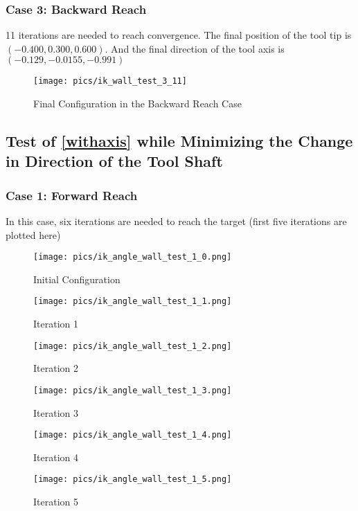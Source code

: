 \documentclass[english,10pt,a4paper]{book}
\begin{document}
		\subsubsection{Case 3: Backward Reach}
		11 iterations are needed to reach convergence.
		The final position of the tool tip is \((-0.400, 0.300, 0.600)\). And the final direction of the tool axis is \((-0.129, -0.0155, -0.991)\)
		\begin{figure}[H]
			\texttt{[image: pics/ik\_wall\_test\_3\_11]}
			\caption{Final Configuration in the Backward Reach Case}
		\end{figure}
		
		\subsection{Test of \ref{withaxis} while Minimizing the Change in Direction of the Tool Shaft}
		\subsubsection{Case 1: Forward Reach}
		In this case, six iterations are needed to reach the target (first five iterations are plotted here)
		\begin{figure}[H]
			\begin{minipage}{0.33\textwidth}
				\centering
				\texttt{[image: pics/ik\_angle\_wall\_test\_1\_0.png]}
				\caption{Initial Configuration}
			\end{minipage}
			\begin{minipage}{0.33\textwidth}
				\centering
				\texttt{[image: pics/ik\_angle\_wall\_test\_1\_1.png]}
				\caption{Iteration 1}
			\end{minipage}
			\begin{minipage}{0.33\textwidth}
				\centering
				\texttt{[image: pics/ik\_angle\_wall\_test\_1\_2.png]}
				\caption{Iteration 2}
			\end{minipage}
		\end{figure}
		\begin{figure}[H]
			\begin{minipage}{0.33\textwidth}
				\centering
				\texttt{[image: pics/ik\_angle\_wall\_test\_1\_3.png]}
				\caption{Iteration 3}
			\end{minipage}
			\begin{minipage}{0.33\textwidth}
				\centering
				\texttt{[image: pics/ik\_angle\_wall\_test\_1\_4.png]}
				\caption{Iteration 4}
			\end{minipage}
			\begin{minipage}{0.33\textwidth}
				\centering
				\texttt{[image: pics/ik\_angle\_wall\_test\_1\_5.png]}
				\caption{Iteration 5}
			\end{minipage}
		\end{figure}
		
\end{document}
